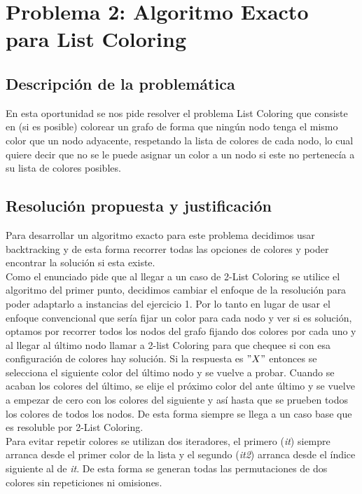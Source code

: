 \newpage
\section{Problema 2: Algoritmo Exacto para List Coloring}

\subsection{Descripción de la problemática}
En esta oportunidad se nos pide resolver el problema List Coloring que consiste en (si es posible) colorear un grafo de forma que ningún nodo tenga el mismo color que un nodo adyacente, respetando la lista de colores de cada nodo, lo cual quiere decir que no se le puede asignar un color a un nodo si este no pertenecía a su lista de colores posibles. 

\subsection{Resolución propuesta y justificación}

Para desarrollar un algoritmo exacto para este problema decidimos usar backtracking y de esta forma recorrer todas las opciones de colores y poder encontrar la solución si esta existe.\\

Como el enunciado pide que al llegar a un caso de 2-List Coloring se utilice el algoritmo del primer punto, decidimos cambiar el enfoque de la resolución para poder adaptarlo a instancias del ejercicio 1. Por lo tanto en lugar de usar el enfoque convencional que sería fijar un color para cada nodo y ver si es solución, optamos por recorrer todos los nodos del grafo fijando dos colores por cada uno y al llegar al último nodo llamar a 2-list Coloring para que chequee si con esa configuración de colores hay solución. Si la respuesta es $"X"$ entonces se selecciona el siguiente color del último nodo y se vuelve a probar. Cuando se acaban los colores del último, se elije el próximo color del ante último y se vuelve a empezar de cero con los colores del siguiente y así hasta que se prueben todos los colores de todos los nodos. De esta forma siempre se llega a un caso base que es resoluble por 2-List Coloring.\\

Para evitar repetir colores se utilizan dos iteradores, el primero (\emph{it}) siempre arranca desde el primer color de la lista y el segundo (\emph{it2}) arranca desde el índice siguiente al de \emph{it}. De esta forma se generan todas las permutaciones de dos colores sin repeticiones ni omisiones.

